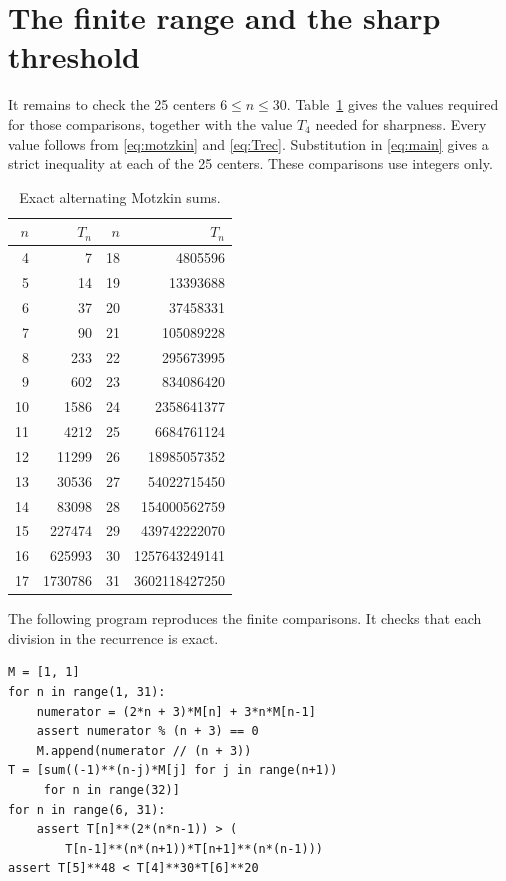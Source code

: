 \documentclass[11pt]{article}
\begin{document}
\section{The finite range and the sharp threshold}

It remains to check the 25 centers $6\le n\le30$.
Table~\ref{tab:values} gives the values required for those comparisons,
together with the value $T_4$ needed for sharpness.
Every value follows from \eqref{eq:motzkin} and \eqref{eq:Trec}.
Substitution in \eqref{eq:main} gives a strict inequality at each of the
25 centers. These comparisons use integers only.

\begin{table}[ht]
\centering\small
\begin{tabular}{rr@{\qquad}rr}
\toprule
$n$&$T_n$&$n$&$T_n$\\\midrule
4&7&18&4805596\\
5&14&19&13393688\\
6&37&20&37458331\\
7&90&21&105089228\\
8&233&22&295673995\\
9&602&23&834086420\\
10&1586&24&2358641377\\
11&4212&25&6684761124\\
12&11299&26&18985057352\\
13&30536&27&54022715450\\
14&83098&28&154000562759\\
15&227474&29&439742222070\\
16&625993&30&1257643249141\\
17&1730786&31&3602118427250\\\bottomrule
\end{tabular}
\caption{Exact alternating Motzkin sums.}\label{tab:values}
\end{table}

The following program reproduces the finite comparisons. It checks that
each division in the recurrence is exact.
\begin{verbatim}
M = [1, 1]
for n in range(1, 31):
    numerator = (2*n + 3)*M[n] + 3*n*M[n-1]
    assert numerator % (n + 3) == 0
    M.append(numerator // (n + 3))
T = [sum((-1)**(n-j)*M[j] for j in range(n+1))
     for n in range(32)]
for n in range(6, 31):
    assert T[n]**(2*(n*n-1)) > (
        T[n-1]**(n*(n+1))*T[n+1]**(n*(n-1)))
assert T[5]**48 < T[4]**30*T[6]**20
\end{verbatim}
\end{document}
